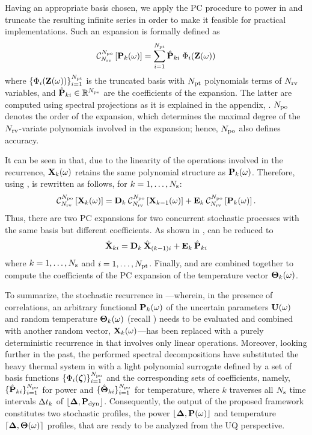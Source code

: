 Having an appropriate basis chosen, we apply the PC procedure to power in  and truncate the resulting infinite series in order to make it feasible for practical implementations. Such an expansion is formally defined as
\begin{equation} \elabel{pc-expansion}
  \oPC{\vars}{\pcorder}{\vP_k(\o)} = \sum_{i = 1}^{\pcterms} \pcc{\vP}_{ki} \; \pcb_i(\vZ(\o))
\end{equation}
where $\{ \Phi_i(\mathbf{Z}(\omega)) \}_{i = 1}^{{N_\text{pt}}}$ is the truncated basis with ${N_\text{pt}}$ polynomials terms of ${N_\text{rv}}$ variables, and $\hat{\mathbf{P}}_{ki} \in \mathbb{R}^{N_\text{pe}}$ are the coefficients of the expansion. The latter are computed using spectral projections as it is explained in the appendix, . ${N_\text{po}}$ denotes the order of the expansion, which determines the maximal degree of the ${N_\text{rv}}$-variate polynomials involved in the expansion; hence, ${N_\text{po}}$ also defines accuracy.

It can be seen in  that, due to the linearity of the operations involved in the recurrence, $\mathbf{X}_k(\omega)$ retains the same polynomial structure as $\mathbf{P}_k(\omega)$. Therefore, using ,  is rewritten as follows, for $k = 1, \dotsc, N_\text{s}$:
\begin{equation} \elabel{expanded-recurrence}
  \oPC{\vars}{\pcorder}{\vX_k(\o)} = \mCF_k \: \oPC{\vars}{\pcorder}{\vX_{k-1}(\o)} + \mCS_k \: \oPC{\vars}{\pcorder}{\vP_k(\o)}.
\end{equation}
Thus, there are two PC expansions for two concurrent stochastic processes with the same basis but different coefficients. As shown in ,  can be reduced to
\begin{equation} \elabel{pc-recurrence}
  \pcc{\vX}_{ki} = \mCF_k \: \pcc{\vX}_{(k - 1)i} + \mCS_k \: \pcc{\vP}_{ki}
\end{equation}
where $k = 1, \dotsc, N_\text{s}$ and $i = 1, \dotsc, {N_\text{pt}}$. Finally,  and  are combined together to compute the coefficients of the PC expansion of the temperature vector ${\boldsymbol\Theta}_k(\omega)$.

To summarize, the stochastic recurrence in ---wherein, in the presence of correlations, an arbitrary functional $\mathbf{P}_k(\omega)$ of the uncertain parameters $\mathbf{U}(\omega)$ and random temperature ${\boldsymbol\Theta}_k(\omega)$ (recall ) needs to be evaluated and combined with another random vector, $\mathbf{X}_k(\omega)$---has been replaced with a purely deterministic recurrence in  that involves only linear operations. Moreover, looking further in the past, the performed spectral decompositions have substituted the heavy thermal system in  with a light polynomial surrogate defined by a set of basis functions $\{ \Phi_i(\boldsymbol{\zeta}) \}_{i = 1}^{{N_\text{po}}}$ and the corresponding sets of coefficients, namely, $\{ \hat{\mathbf{P}}_{ki} \}_{i = 1}^{{N_\text{po}}}$ for power and $\{ \hat{{\boldsymbol\Theta}}_{ki} \}_{i = 1}^{{N_\text{po}}}$ for temperature, where $k$ traverses all $N_\text{s}$ time intervals $\Delta t_k$ of $\profPdyn$. Consequently, the output of the proposed framework constitutes two stochastic profiles, the power $\profP{\o}$ and temperature $\profT{\o}$ profiles, that are ready to be analyzed from the UQ perspective.
